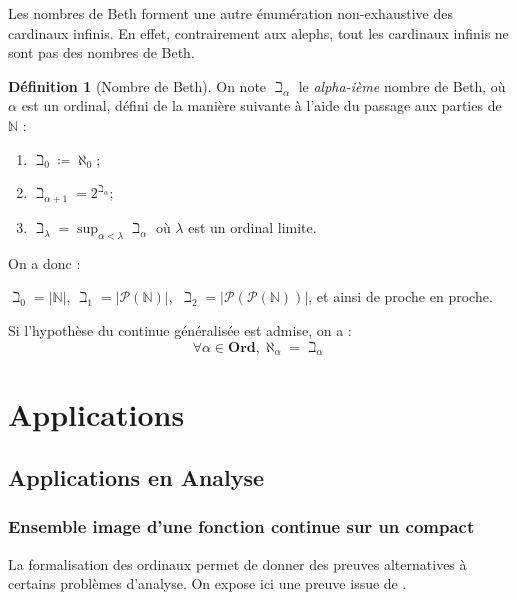 \documentclass[french]{article}
\theoremstyle{definition}
\newtheorem{definition}[subsubsection]{Définition}
\theoremstyle{plain}
\theoremstyle{plain}
\theoremstyle{plain}
\theoremstyle{plain}
\theoremstyle{plain}
\begin{document}
\par Les nombres de Beth forment une autre énumération non-exhaustive des cardinaux infinis. En effet, contrairement aux alephs, tout les cardinaux infinis ne sont pas des nombres de Beth.
\begin{definition}[Nombre de Beth]
	On note \( \beth_{\alpha} \) le \textit{alpha-ième} nombre de Beth, où \( \alpha \) est un ordinal, défini de la manière suivante à l'aide du passage aux parties de \( \mathbb{N} \) :
	\begin{enumerate}[label = (\roman*) ]
		\item \( \beth_{0} \coloneqq \aleph_{0} \);
		\item \( \beth_{\alpha + 1} = 2^{\beth_{\alpha}} \);
		\item \( \beth_{\lambda} = \sup_{\alpha < \lambda} \beth_{\alpha} \) où \( \lambda \) est un ordinal limite.
	\end{enumerate}

	\par On a donc : 

	\( \beth_{0} = |\mathbb{N}| \), \( \beth_{1} = |\mathcal{P}(\mathbb{N})|,\) \( \beth_{2} = |\mathcal{P}(\mathcal{P}(\mathbb{N}))| \), et ainsi de proche en proche.

\end{definition}
\par Si l'hypothèse du continue généralisée est admise, on a : \cite{4301717}
\begin{equation*}
	\forall \alpha \in \textbf{Ord}, \aleph_{\alpha} = \beth_{\alpha}
\end{equation*}

\clearpage

\section{Applications}
\subsection{Applications en Analyse}
\subsubsection{Ensemble image d'une fonction continue sur un compact}

\par La formalisation des ordinaux permet de donner des preuves alternatives à certains problèmes d'analyse. On expose ici une preuve issue de \cite{gowers2010ordinals}.
\end{document}

